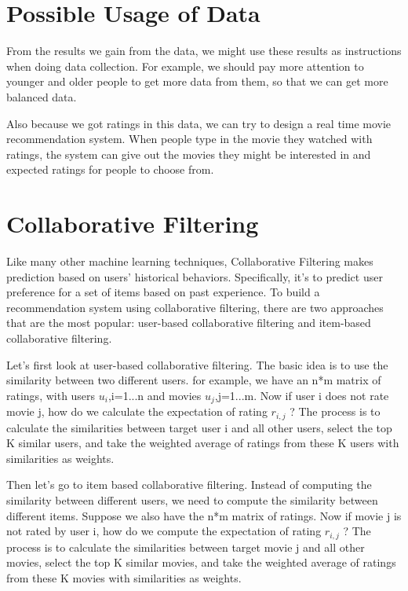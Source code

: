 \documentclass[two column]{article}
\begin{document}
\section{Possible Usage of Data}
\par From the results we gain from the data, we might use these results as instructions when doing data collection. For example, we should pay more attention to younger and older people to get more data from them, so that we can get more balanced data.

\par Also because we got ratings in this data, we can try to design a real time movie recommendation system. When people type in the movie they watched with ratings, the system can give out the movies they might be interested in and expected ratings for people to choose from.


\section{Collaborative Filtering}
\par Like many other machine learning techniques, Collaborative Filtering makes prediction based on users' historical behaviors.  Specifically, it’s to predict user preference for a set of items based on past experience. To build a recommendation system using collaborative filtering, there are two approaches that are the most popular: user-based collaborative filtering and item-based collaborative filtering.

\par Let's first look at user-based collaborative filtering. The basic idea is to use the similarity between two different users.
for example, we have an n*m matrix of ratings, with users $u_i$,i=1...n and movies $u_j$,j=1...m. Now if user i does not rate movie j, how do we calculate the expectation of rating $r_{i,j}$ ?
The process is to calculate the similarities between target user i and all other users, select the top K similar users, and take the weighted average of ratings from these K users with similarities as weights.

\par Then let's go to item based collaborative filtering. Instead of computing the similarity between different users, we need to compute the similarity between different items. Suppose we also have the n*m matrix of ratings. Now if movie j is not rated by user i, how do we compute the expectation of rating $r_{i,j}$ ? The process is to calculate the similarities between target movie j and all other movies, select the top K similar movies, and take the weighted average of ratings from these K movies with similarities as weights.
\end{document}

